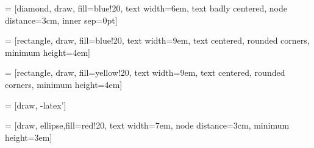 \usepackage{tikz}
\usepackage{makeshape} %
\usetikzlibrary{arrows.meta, calc, decorations.pathreplacing, shapes, arrows}


=
[diamond,
    draw,
    fill=blue!20,
    text
    width=6em,
    text
    badly
    centered,
    node
    distance=3cm,
    inner
sep=0pt]

=
[rectangle,
    draw,
    fill=blue!20,
    text
    width=9em,
    text
    centered,
    rounded
    corners,
    minimum
height=4em]

=
[rectangle,
    draw,
    fill=yellow!20,
    text
    width=9em,
    text
    centered,
    rounded
    corners,
    minimum
height=4em]

=
[draw,
-latex']

=
[draw,
    ellipse,fill=red!20,
    text
    width=7em,
    node
    distance=3cm,
    minimum
height=3em]